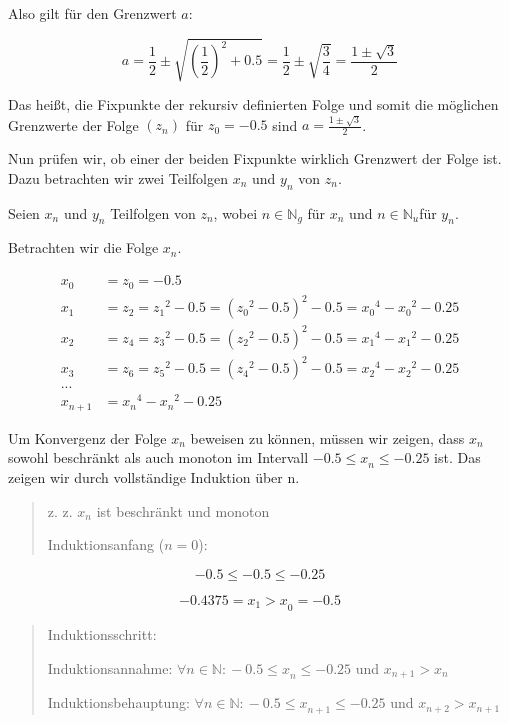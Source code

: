 \documentclass[a4paper, 12pt]{book}
\begin{document}
Also gilt für den Grenzwert \(a\):

\[a = \frac{1}{2} \pm \sqrt{\left( \frac{1}{2} \right)^{2} + 0.5} = \frac{1}{2} \pm \sqrt{\frac{3}{4}} = \frac{1 \pm \sqrt{3}}{2}\]

Das heißt, die Fixpunkte der rekursiv definierten Folge und somit die
möglichen Grenzwerte der Folge \(\left( z_{n} \right)\) für
\(z_{0} =  - 0.5\) sind \(a = \frac{1 \pm \sqrt{3}}{2}\).

Nun prüfen wir, ob einer der beiden Fixpunkte wirklich Grenzwert der
Folge ist. Dazu betrachten wir zwei Teilfolgen \(x_{n}\) und \(y_{n}\)
von \(z_{n}\).

Seien \(x_{n}\) und \(y_{n}\) Teilfolgen von \(z_{n}\), wobei
\(n \in \mathbb{N}_{g}\) für \(x_{n}\) und
\(n \in \mathbb{N}_{u}\)für \(y_{n}\).

Betrachten wir die Folge \(x_{n}\).

\begin{align*}
x_{0} &= z_{0} =  - 0.5\\
x_{1} &= z_{2} = {z_{1}}^{2} - 0.5 = ({z_{0}}^{2} - 0.5)^{2} - 0.5 = {x_{0}}^{4} - {x_{0}}^{2} - 0.25\\
x_{2} &= z_{4} = {z_{3}}^{2} - 0.5 = ({z_{2}}^{2} - 0.5)^{2} - 0.5 = {x_{1}}^{4} - {x_{1}}^{2} - 0.25\\
x_{3} &= z_{6} = {z_{5}}^{2} - 0.5 = ({z_{4}}^{2} - 0.5)^{2} - 0.5 = {x_{2}}^{4} - {x_{2}}^{2} - 0.25\\
... &\\
x_{n + 1} &= {x_{n}}^{4} - {x_{n}}^{2} - 0.25
\end{align*}

Um Konvergenz der Folge \(x_{n}\) beweisen zu können, müssen wir zeigen,
dass \(x_{n}\) sowohl beschränkt als auch monoton im Intervall
\(- 0.5{\leq x}_{n} \leq  - 0.25\) ist. Das zeigen wir durch
vollständige Induktion über n.

\begin{quote}
z. z. \(x_{n}\) ist beschränkt und monoton

Induktionsanfang (\(n = 0\)):
\end{quote}

\[- 0.5 \leq  - 0.5 \leq  - 0.25\]

\[{{- 0.4375 = x}_{1} > x}_{0} =  - 0.5\]

\begin{quote}
Induktionsschritt:

Induktionsannahme:
\(\forall n \in \mathbb{N:} - 0.5{\leq x}_{n} \leq  - 0.25\)
und \(x_{n + 1} > x_{n}\)

Induktionsbehauptung:
\(\forall n \in \mathbb{N:} - 0.5{\leq x}_{n + 1} \leq  - 0.25\)
und \(x_{n + 2} > x_{n + 1}\)
\end{quote}
\end{document}
